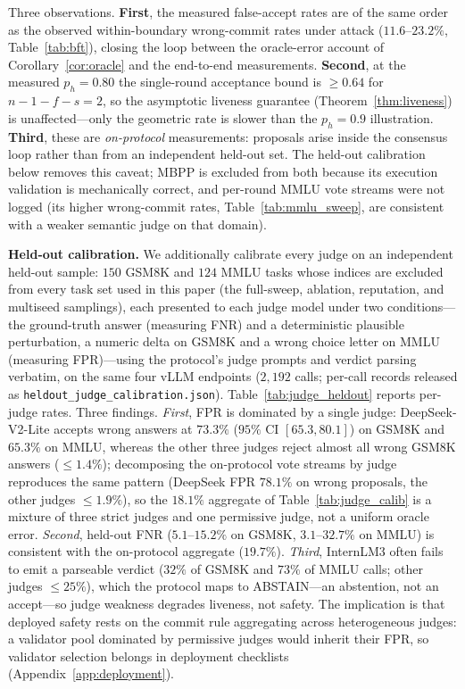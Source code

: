\documentclass{article}
\begin{document}
Three observations. \textbf{First}, the measured false-accept rates are of the same order as the observed within-boundary wrong-commit rates under attack ($11.6$--$23.2\%$, Table~\ref{tab:bft}), closing the loop between the oracle-error account of Corollary~\ref{cor:oracle} and the end-to-end measurements. \textbf{Second}, at the measured $p_h = 0.80$ the single-round acceptance bound is $\geq 0.64$ for $n{-}1{-}f{-}s = 2$, so the asymptotic liveness guarantee (Theorem~\ref{thm:liveness}) is unaffected---only the geometric rate is slower than the $p_h = 0.9$ illustration. \textbf{Third}, these are \emph{on-protocol} measurements: proposals arise inside the consensus loop rather than from an independent held-out set. The held-out calibration below removes this caveat; MBPP is excluded from both because its execution validation is mechanically correct, and per-round MMLU vote streams were not logged (its higher wrong-commit rates, Table~\ref{tab:mmlu_sweep}, are consistent with a weaker semantic judge on that domain).

\textbf{Held-out calibration.} We additionally calibrate every judge on an independent held-out sample: $150$ GSM8K and $124$ MMLU tasks whose indices are excluded from every task set used in this paper (the full-sweep, ablation, reputation, and multiseed samplings), each presented to each judge model under two conditions---the ground-truth answer (measuring FNR) and a deterministic plausible perturbation, a numeric delta on GSM8K and a wrong choice letter on MMLU (measuring FPR)---using the protocol's judge prompts and verdict parsing verbatim, on the same four vLLM endpoints ($2{,}192$ calls; per-call records released as \texttt{heldout\_judge\_calibration.json}). Table~\ref{tab:judge_heldout} reports per-judge rates. Three findings. \emph{First}, FPR is dominated by a single judge: DeepSeek-V2-Lite accepts wrong answers at $73.3\%$ ($95\%$ CI $[65.3, 80.1]$) on GSM8K and $65.3\%$ on MMLU, whereas the other three judges reject almost all wrong GSM8K answers ($\leq 1.4\%$); decomposing the on-protocol vote streams by judge reproduces the same pattern (DeepSeek FPR $78.1\%$ on wrong proposals, the other judges $\leq 1.9\%$), so the $18.1\%$ aggregate of Table~\ref{tab:judge_calib} is a mixture of three strict judges and one permissive judge, not a uniform oracle error. \emph{Second}, held-out FNR ($5.1$--$15.2\%$ on GSM8K, $3.1$--$32.7\%$ on MMLU) is consistent with the on-protocol aggregate ($19.7\%$). \emph{Third}, InternLM3 often fails to emit a parseable verdict ($32\%$ of GSM8K and $73\%$ of MMLU calls; other judges $\leq 25\%$), which the protocol maps to ABSTAIN---an abstention, not an accept---so judge weakness degrades liveness, not safety. The implication is that deployed safety rests on the commit rule aggregating across heterogeneous judges: a validator pool dominated by permissive judges would inherit their FPR, so validator selection belongs in deployment checklists (Appendix~\ref{app:deployment}).
\end{document}
